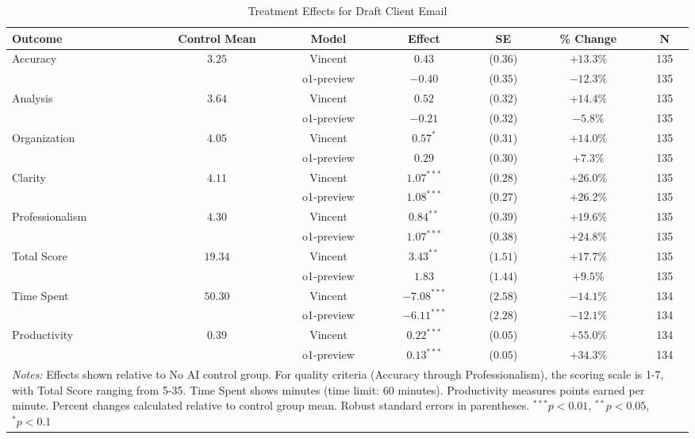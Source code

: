 \begin{table}[!htbp]
\centering
\caption{Treatment Effects for Draft Client Email}
\label{tab:task1_effects}
\begin{tabular}{lcccccc}
\hline\hline
Outcome & Control Mean & Model & Effect & SE & \% Change & N \\
\hline
\multirow{2}{*}{Accuracy} & \multirow{2}{*}{$3.25$} & Vincent & $0.43$ & ($0.36$) & $+13.3\%$ & 135 \\
& & o1-preview & $-0.40$ & ($0.35$) & $-12.3\%$ & 135 \\
\hline
\multirow{2}{*}{Analysis} & \multirow{2}{*}{$3.64$} & Vincent & $0.52$ & ($0.32$) & $+14.4\%$ & 135 \\
& & o1-preview & $-0.21$ & ($0.32$) & $-5.8\%$ & 135 \\
\hline
\multirow{2}{*}{Organization} & \multirow{2}{*}{$4.05$} & Vincent & $0.57^{*}$ & ($0.31$) & $+14.0\%$ & 135 \\
& & o1-preview & $0.29$ & ($0.30$) & $+7.3\%$ & 135 \\
\hline
\multirow{2}{*}{Clarity} & \multirow{2}{*}{$4.11$} & Vincent & $1.07^{***}$ & ($0.28$) & $+26.0\%$ & 135 \\
& & o1-preview & $1.08^{***}$ & ($0.27$) & $+26.2\%$ & 135 \\
\hline
\multirow{2}{*}{Professionalism} & \multirow{2}{*}{$4.30$} & Vincent & $0.84^{**}$ & ($0.39$) & $+19.6\%$ & 135 \\
& & o1-preview & $1.07^{***}$ & ($0.38$) & $+24.8\%$ & 135 \\
\hline
\multirow{2}{*}{Total Score} & \multirow{2}{*}{$19.34$} & Vincent & $3.43^{**}$ & ($1.51$) & $+17.7\%$ & 135 \\
& & o1-preview & $1.83$ & ($1.44$) & $+9.5\%$ & 135 \\
\hline
\multirow{2}{*}{Time Spent} & \multirow{2}{*}{$50.30$} & Vincent & $-7.08^{***}$ & ($2.58$) & $-14.1\%$ & 134 \\
& & o1-preview & $-6.11^{***}$ & ($2.28$) & $-12.1\%$ & 134 \\
\hline
\multirow{2}{*}{Productivity} & \multirow{2}{*}{$0.39$} & Vincent & $0.22^{***}$ & ($0.05$) & $+55.0\%$ & 134 \\
& & o1-preview & $0.13^{***}$ & ($0.05$) & $+34.3\%$ & 134 \\
\hline
\multicolumn{7}{p{0.95\linewidth}}{\footnotesize \textit{Notes:} Effects shown relative to No AI control group. For quality criteria (Accuracy through Professionalism), the scoring scale is 1-7, with Total Score ranging from 5-35. Time Spent shows minutes (time limit: 60 minutes). Productivity measures points earned per minute. Percent changes calculated relative to control group mean. Robust standard errors in parentheses. $^{***}p<0.01$, $^{**}p<0.05$, $^{*}p<0.1$}
\end{tabular}
\end{table}